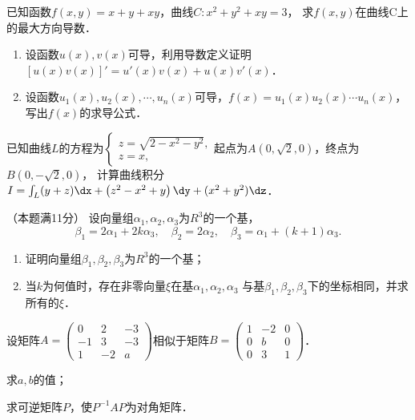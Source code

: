 \documentclass[plain,noanswer,medmath]{../../template/jnuexam}
\begin{document}
\begin{problem}[points=10]
已知函数$f(x,y) = x + y + xy$，曲线$C: x^2 + y^2 + xy = 3$，
求$f(x,y)$在曲线C上的最大方向导数．
\end{problem}


\begin{problem}[points=10]
\begin{enumerate}
\item
设函数$u(x),v(x)$可导，利用导数定义证明$[u(x)v(x)]' = u'(x)v(x) + u(x)v'(x)$．
\item
设函数$u_1(x),u_2(x), \cdots ,u_n(x)$可导，$f(x) = u_1(x) u_2(x) \cdots u_n(x)$，写出$f(x)$的求导公式．
\end{enumerate}
\end{problem}


\begin{problem}[points=10]
已知曲线$L$的方程为$\begin{cases}
  z = \sqrt{2 - x^2 - y^2} , \\
  z = x,
\end{cases}$起点为$A\left(0,\sqrt{2} ,0 \right)$，终点为$B\left(0, - \sqrt{2} ,0 \right)$，
计算曲线积分$I = \int_L (y + z)\dx + \left(z^2 - x^2 + y \right)\dy + (x^2 + y^2)\dz$．
\end{problem}


\begin{problem}
（本题满11分）
设向量组$\alpha_1,\alpha_2,\alpha_3$为$R^3$的一个基，
$$\beta_1 = 2\alpha_1 + 2k\alpha_3,\quad \beta_2 = 2\alpha_2,\quad
  \beta_3 = \alpha_1 + (k + 1)\alpha_3.$$
\begin{enumerate}
\item
证明向量组$\beta_1,\beta_2,\beta_3$为$R^3$的一个基；
\item
当$k$为何值时，存在非零向量$\xi$在基$\alpha_1,\alpha_2,\alpha_3$
与基$\beta_1,\beta_2,\beta_3$下的坐标相同，并求所有的$\xi$．
\end{enumerate}
\end{problem}


\begin{problem}[points=11]
设矩阵$A = \begin{pmatrix}
   0 &  2 & -3 \\
  -1 &  3 & -3 \\
   1 & -2 & a
\end{pmatrix}$相似于矩阵$B = \begin{pmatrix}
  1 & -2 & 0 \\
  0 &  b & 0 \\
  0 &  3 & 1
\end{pmatrix}$．\par
\begin{enumerate*}
\item 求$a,b$的值；
\item 求可逆矩阵$P$，使$P^{-1} AP$为对角矩阵．
\end{enumerate*}
\end{problem}
\end{document}
